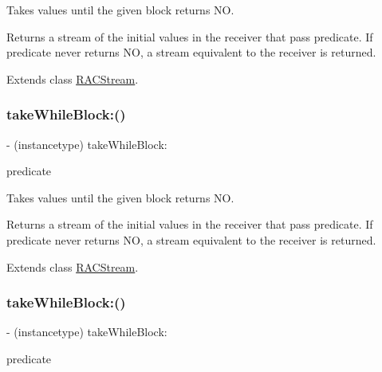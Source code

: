 Takes values until the given block returns {\ttfamily NO}.

Returns a stream of the initial values in the receiver that pass {\ttfamily predicate}. If {\ttfamily predicate} never returns {\ttfamily NO}, a stream equivalent to the receiver is returned. 

Extends class \mbox{\hyperlink{interface_r_a_c_stream_ae3b27f126fffcf5dfb8eaa6bd71c5fc4}{R\+A\+C\+Stream}}.

\mbox{\label{category_r_a_c_stream_07_operations_08_ae3b27f126fffcf5dfb8eaa6bd71c5fc4}} 
\subsubsection{\texorpdfstring{take\+While\+Block\+:()}{takeWhileBlock:()}\hspace{0.1cm}{\footnotesize\ttfamily [2/3]}}
{\footnotesize\ttfamily -\/ (instancetype) take\+While\+Block\+: \begin{DoxyParamCaption}\item[{(B\+O\+OL($^\wedge$)(id x))}]{predicate }\end{DoxyParamCaption}}

Takes values until the given block returns {\ttfamily NO}.

Returns a stream of the initial values in the receiver that pass {\ttfamily predicate}. If {\ttfamily predicate} never returns {\ttfamily NO}, a stream equivalent to the receiver is returned. 

Extends class \mbox{\hyperlink{interface_r_a_c_stream_ae3b27f126fffcf5dfb8eaa6bd71c5fc4}{R\+A\+C\+Stream}}.

\mbox{\label{category_r_a_c_stream_07_operations_08_ae3b27f126fffcf5dfb8eaa6bd71c5fc4}} 
\subsubsection{\texorpdfstring{take\+While\+Block\+:()}{takeWhileBlock:()}\hspace{0.1cm}{\footnotesize\ttfamily [3/3]}}
{\footnotesize\ttfamily -\/ (instancetype) take\+While\+Block\+: \begin{DoxyParamCaption}\item[{(B\+O\+OL($^\wedge$)(id x))}]{predicate }\end{DoxyParamCaption}}

